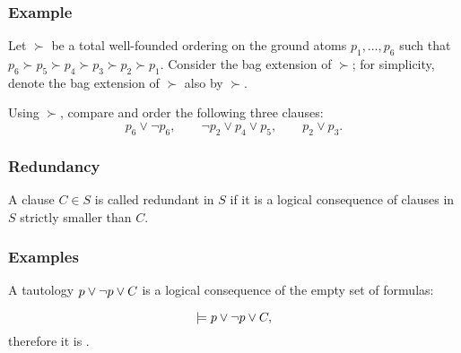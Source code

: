 \begin{frame}\frametitle{Example}

  Let $\succ$ be a total well-founded ordering on the ground atoms
$p_1, \ldots, p_6$ such that $p_6\succ p_5\succ p_4\succ p_3 \succ p_2
\succ p_1$. Consider
the bag extension of $\succ$; for simplicity, denote the bag extension 
of $\succ$ also by $\succ$. 

\bigskip


Using $\succ$, compare and order the following three clauses: 
\[p_6\vee \neg p_6,\qquad \neg p_2\vee
  p_4\vee p_5, \qquad p_2\vee p_3.\]

 \end{frame} 

                                
                                
                     \begin{frame}\frametitle{Redundancy}

A clause $C \in S$ is called \alert{redundant in $S$} if it is a
logical consequence of clauses in $S$ strictly smaller than $C$.

                              \end{frame}



              	   \begin{frame}
           \frametitle{Examples}

A \alert{tautology} $p \vee \neg p \vee C$ is a logical consequence of the
empty set of formulas:

\[
\models p \vee \neg p \vee C,
\]
therefore it is .


\medskip


                           \end{frame}

